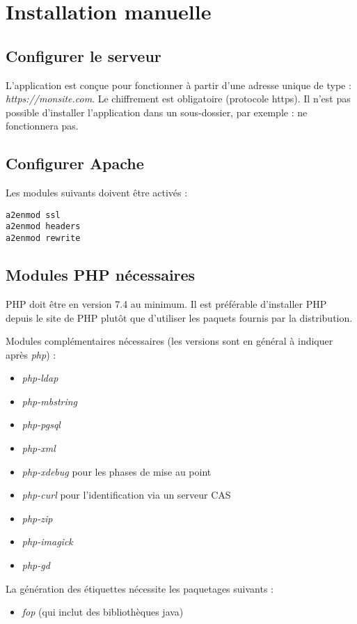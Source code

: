 \section{Installation manuelle}
\subsection{Configurer le serveur}

L'application est conçue pour fonctionner à partir d'une adresse unique de type : {\NoAutoSpacing\textit{https://monsite.com}}. Le chiffrement est obligatoire (protocole https). Il n'est pas possible d'installer l'application dans un sous-dossier, par exemple :  ne fonctionnera pas.


\subsection{Configurer Apache}
Les modules suivants doivent être activés :
\begin{lstlisting}
a2enmod ssl
a2enmod headers
a2enmod rewrite
\end{lstlisting}

\subsection{Modules PHP nécessaires}
PHP doit être en version 7.4 au minimum. Il est préférable d'installer PHP depuis le site de PHP plutôt que d'utiliser les paquets fournis par la distribution.

Modules complémentaires nécessaires (les versions sont en général à indiquer après \textit{php}) :
\begin{itemize}
\item \textit{php-ldap}
\item \textit{php-mbstring}
\item \textit{php-pgsql}
\item \textit{php-xml} 
\item \textit{php-xdebug} pour les phases de mise au point
\item \textit{php-curl} pour l'identification via un serveur CAS
\item \textit{php-zip}
\item \textit{php-imagick}
\item \textit{php-gd}

\end{itemize}
La génération des étiquettes nécessite les paquetages suivants :
\begin{itemize}
\item \textit{fop} (qui inclut des bibliothèques java)
\end{itemize}


